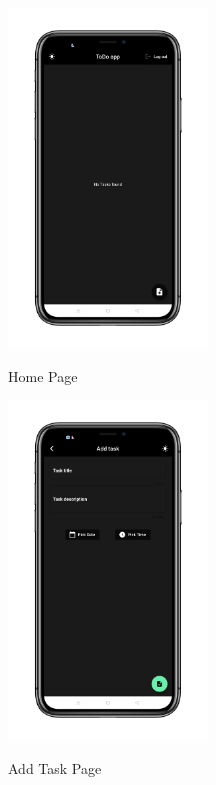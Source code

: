 \begin{figure}
\centering
\begin{minipage}{.5\textwidth}
  \centering
   \includegraphics[height=90mm]{Images & Logos/theme/CH_08_Dark_3.png}
  \caption{Home Page}
\end{minipage}%
\begin{minipage}{.5\textwidth}
  \centering
   \includegraphics[height=90mm]{Images & Logos/theme/CH_08_Dark_4.png}\\
  \caption{Add Task Page}
\end{minipage}
\newpage
\end{figure}

